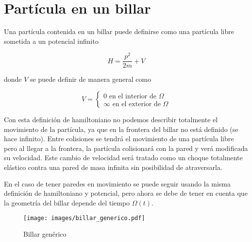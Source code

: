 \documentclass[11pt, spanish]{book}
\begin{document}
\chapter{Partícula en un billar}

Una partícula contenida en un billar puede definirse como una partícula libre sometida a un potencial infinito

\begin{equation}
    H = \dfrac{p^2}{2m} + V
\end{equation}

donde \( V \) se puede definir de manera general como

\begin{equation}
    V = \begin{cases}
        0 \text{ en el interior de } \Omega \\
        \infty \text{ en el exterior de } \Omega
    \end{cases}
\end{equation}

\vspace{3mm}

Con esta definición de hamiltoniano no podemos describir totalmente el movimiento de la partícula, ya que en la frontera del billar no está definido (se hace infinito). Entre colisiones se tendrá el movimiento de una partícula libre pero al llegar a la frontera, la partícula colisionará con la pared y verá modificada su velocidad. Este cambio de velocidad será tratado como un choque totalmente elástico contra una pared de masa infinita sin posibilidad de atraversarla. 

\vspace{3mm}

En el caso de tener paredes en movimiento se puede seguir usando la misma definición de hamiltoniano y potencial, pero ahora se debe de tener en cuenta que la geometría del billar depende del tiempo \( \Omega(t) \).

\begin{figure}[H]
    \centering
    \texttt{[image: images/billar\_generico.pdf]}
    \caption{Billar genérico}
    \label{fig:bilar_generico}
\end{figure}


\vspace{3mm}

\begin{figure}
    
\end{figure}
\end{document}
